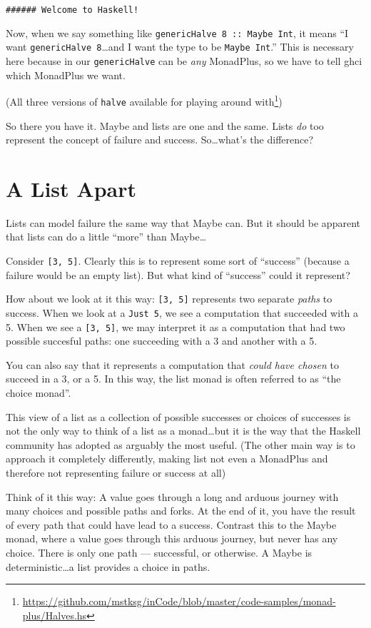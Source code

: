 \documentclass[]{article}
\renewcommand{\href}[2]{#2\footnote{\url{#1}}}
\begin{document}
\begin{verbatim}
###### Welcome to Haskell!
\end{verbatim}

Now, when we say something like \texttt{genericHalve\ 8\ ::\ Maybe\ Int}, it means ``I want
\texttt{genericHalve\ 8}\ldots{}and I want the type to be \texttt{Maybe\ Int}.'' This is necessary
here because in our \texttt{genericHalve} can be \emph{any} MonadPlus, so we have to tell ghci which
MonadPlus we want.

(\href{https://github.com/mstksg/inCode/blob/master/code-samples/monad-plus/Halves.hs}{All three
versions of \texttt{halve} available for playing around with})

So there you have it. Maybe and lists are one and the same. Lists \emph{do} too represent the
concept of failure and success. So\ldots{}what's the difference?

\section{A List Apart}\label{a-list-apart}

Lists can model failure the same way that Maybe can. But it should be apparent that lists can do a
little ``more'' than Maybe\ldots{}

Consider \texttt{{[}3,\ 5{]}}. Clearly this is to represent some sort of ``success'' (because a
failure would be an empty list). But what kind of ``success'' could it represent?

How about we look at it this way: \texttt{{[}3,\ 5{]}} represents two separate \emph{paths} to
success. When we look at a \texttt{Just\ 5}, we see a computation that succeeded with a 5. When we
see a \texttt{{[}3,\ 5{]}}, we may interpret it as a computation that had two possible succesful
paths: one succeeding with a 3 and another with a 5.

You can also say that it represents a computation that \emph{could have chosen} to succeed in a 3,
or a 5. In this way, the list monad is often referred to as ``the choice monad''.

This view of a list as a collection of possible successes or choices of successes is not the only
way to think of a list as a monad\ldots{}but it is the way that the Haskell community has adopted as
arguably the most useful. (The other main way is to approach it completely differently, making list
not even a MonadPlus and therefore not representing failure or success at all)

Think of it this way: A value goes through a long and arduous journey with many choices and possible
paths and forks. At the end of it, you have the result of every path that could have lead to a
success. Contrast this to the Maybe monad, where a value goes through this arduous journey, but
never has any choice. There is only one path --- successful, or otherwise. A Maybe is
deterministic\ldots{}a list provides a choice in paths.
\end{document}
